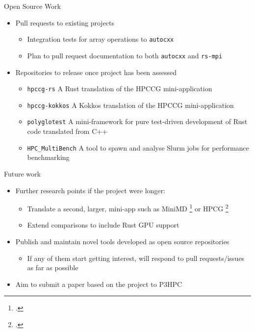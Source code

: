 \documentclass[10pt,aspectratio=169]{beamer}
\begin{document}
\begin{frame}{Open Source Work}
    \begin{itemize}
        \item Pull requests to existing projects
        \begin{itemize}
            \item Integration tests for array operations to \texttt{autocxx}
            \item Plan to pull request documentation to both \texttt{autocxx} and \texttt{rs-mpi}
        \end{itemize}
        \vspace*{0.25cm}
        \item Repositories to release once project has been assessed
        \begin{itemize}
            \item \texttt{hpccg-rs} A Rust translation of the HPCCG mini-application
            \item \texttt{hpccg-kokkos} A Kokkos translation of the HPCCG mini-application
            \item \texttt{polyglotest} A mini-framework for pure test-driven development of Rust code translated from C++
            \item \texttt{HPC\_MultiBench} A tool to spawn and analyse Slurm jobs for performance benchmarking
        \end{itemize}
    \end{itemize}
\end{frame}

\begin{frame}{Future work}
    \begin{itemize}
        \item<1-> Further research points if the project were longer:
        \begin{itemize}
            \item Translate a second, larger, mini-app such as MiniMD \footcite{osti_1231191} or HPCG \footcite{dongarra2015hpcg}
            \item Extend comparisons to include Rust GPU support
        \end{itemize}
        \vspace{1cm}
        \item<2-> \alert{Publish and maintain novel tools developed} as open source repositories
        \begin{itemize}
            \item If any of them start getting interest, will respond to pull requests/issues as far as possible
        \end{itemize}
        \item<3-> \alert{Aim to submit a paper} based on the project to P3HPC
    \end{itemize}
\end{frame}
\end{document}
